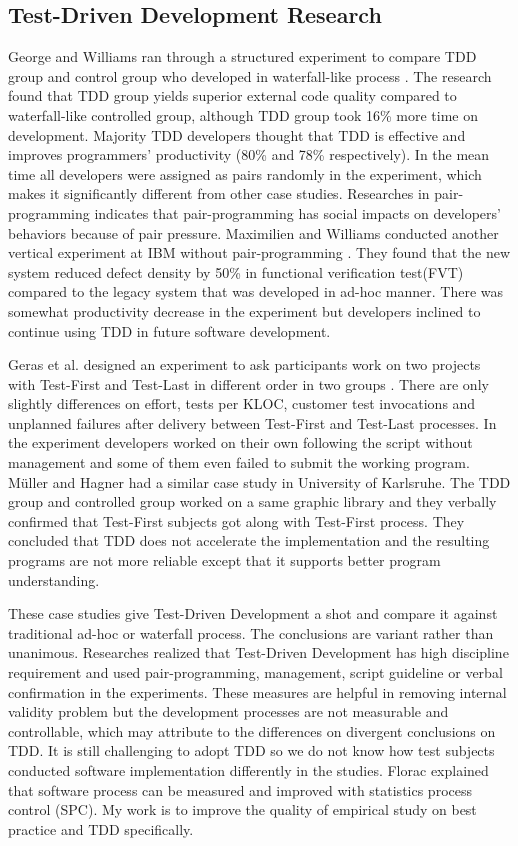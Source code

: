 \subsection{Test-Driven Development Research}
George and Williams ran through a structured experiment to compare TDD
group and control group who developed in waterfall-like process
\cite{George:03}. The research found that TDD group yields superior
external code quality compared to waterfall-like controlled group, although
TDD group took 16\% more time on development. Majority TDD developers
thought that TDD is effective and improves programmers' productivity
(80\% and 78\% respectively). In the mean time all developers were assigned
as pairs randomly in the experiment, which makes it significantly different
from other case studies. Researches in pair-programming indicates that
pair-programming has social impacts on developers' behaviors because of
pair pressure. Maximilien and Williams conducted another vertical
experiment at IBM without pair-programming \cite{Maximilien:03}. They found
that the new system reduced defect density by 50\% in functional
verification test(FVT) compared to the legacy system that was developed in
ad-hoc manner. There was somewhat productivity decrease in the experiment
but developers inclined to continue using TDD in future software
development.

Geras et al. designed an experiment to ask participants work on two projects
with Test-First and Test-Last in different order in two groups
\cite{Geras:04}. There are only slightly differences on effort, tests per
KLOC, customer test invocations and unplanned failures after delivery
between Test-First and Test-Last processes. In the experiment developers
worked on their own following the script without management and some of
them even failed to submit the working program. M\"uller and Hagner had a
similar case study in University of Karlsruhe\cite{Muller:02}. The TDD
group and controlled group worked on a same graphic library and they
verbally confirmed that Test-First subjects got along with Test-First
process. They concluded that TDD does not accelerate the implementation and
the resulting programs are not more reliable except that it supports
better program understanding. 

These case studies give Test-Driven Development a shot and compare it
against traditional ad-hoc or waterfall process. The conclusions are
variant rather than unanimous. Researches realized that Test-Driven
Development has high discipline requirement and used pair-programming,
management, script guideline or verbal confirmation in the experiments.
These measures are helpful in removing internal validity problem but the
development processes are not measurable and controllable, which may
attribute to the differences on divergent conclusions on TDD. It is still
challenging to adopt TDD \cite{Janzen:05} so we do not know how test
subjects conducted software implementation differently in the studies.
Florac \cite{Florac:99} explained that software process can be measured and
improved with statistics process control (SPC). My work is to improve the
quality of empirical study on best practice and TDD specifically.

